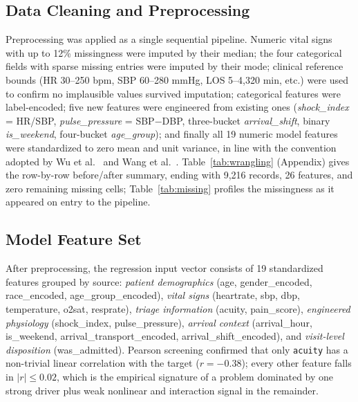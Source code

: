 \documentclass[conference]{IEEEtran}
\begin{document}
\subsection{Data Cleaning and Preprocessing}
Preprocessing was applied as a single sequential pipeline. Numeric vital
signs with up to 12\% missingness were imputed by their median; the four
categorical fields with sparse missing entries were imputed by their mode;
clinical reference bounds (HR 30--250 bpm, SBP 60--280 mmHg, LOS
5--4{,}320 min, etc.) were used to confirm no implausible values survived
imputation; categorical features were label-encoded; five new features were
engineered from existing ones (\textit{shock\_index} = HR/SBP,
\textit{pulse\_pressure} = SBP$-$DBP, three-bucket \textit{arrival\_shift},
binary \textit{is\_weekend}, four-bucket \textit{age\_group}); and finally
all 19 numeric model features were standardized to zero mean and unit
variance, in line with the convention adopted by Wu et al.~\cite{wu2025}
and Wang et al.~\cite{wang2025fair}. Table~\ref{tab:wrangling} (Appendix)
gives the row-by-row before/after summary, ending with 9{,}216 records,
26 features, and zero remaining missing cells; Table~\ref{tab:missing}
profiles the missingness as it appeared on entry to the pipeline.

\subsection{Model Feature Set}
After preprocessing, the regression input vector consists of 19 standardized
features grouped by source: \textit{patient demographics} (age,
gender\_encoded, race\_encoded, age\_group\_encoded), \textit{vital signs}
(heartrate, sbp, dbp, temperature, o2sat, resprate), \textit{triage
information} (acuity, pain\_score), \textit{engineered physiology}
(shock\_index, pulse\_pressure), \textit{arrival context} (arrival\_hour,
is\_weekend, arrival\_transport\_encoded, arrival\_shift\_encoded), and
\textit{visit-level disposition} (was\_admitted). Pearson screening
confirmed that only \texttt{acuity} has a non-trivial linear correlation
with the target ($r=-0.38$); every other feature falls in $|r|\leq 0.02$,
which is the empirical signature of a problem dominated by one strong driver
plus weak nonlinear and interaction signal in the remainder.
\end{document}
